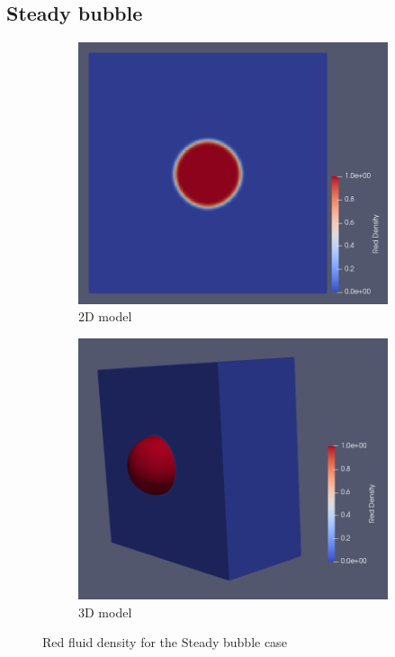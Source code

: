 \documentclass[12pt]{book}
\begin{document}
\subsection{Steady bubble} 
\begin{figure}[H]
	\centering
	\begin{subfigure}{.49\textwidth}
		\includegraphics[width=\linewidth]{Resources/Images/steadyBubble.png}
		\caption{2D model}
	\end{subfigure}
	\begin{subfigure}{.49\textwidth}
		\includegraphics[width=\linewidth]{Resources/Images/steadyBubble3d.png}
		\caption{3D model}
	\end{subfigure} 
	\caption{Red fluid density for the Steady bubble case}
	\label{fig:steady}
\end{figure} 
\end{document}
